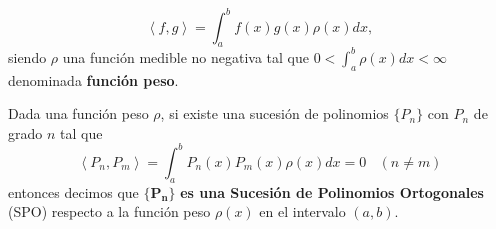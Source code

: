 \begin{equation}
    \label{eq:deffuncionpeso}
    \left\langle f,g \right\rangle=\int_a^b f(x)g(x)\rho(x)dx,
\end{equation}
siendo $\rho$ una función medible no negativa tal que $0<\int_a^b\rho(x)dx<\infty$ denominada \textbf{función peso}.

\begin{definicion}
    Dada una función peso $\rho$, si existe una sucesión de polinomios $\{P_n\}$ con $P_n$ de grado $n$ tal que 
    $$
    \left\langle P_n,P_m \right\rangle=\int_a^b P_n(x)P_m(x)\rho(x)dx=0 \ \ \ \ (n\not=m)
    $$
    entonces decimos que $\mathbf{\{P_n\}}$ \textbf{es una Sucesión de Polinomios Ortogonales} (SPO) respecto a la función peso $\rho(x)$ en el intervalo $(a,b)$.  
\end{definicion}
